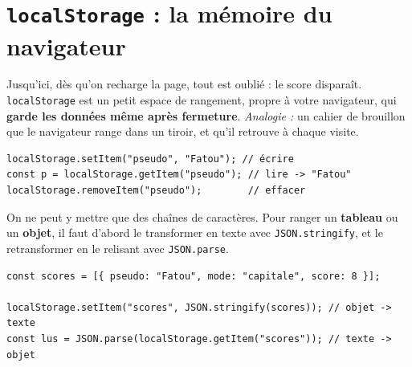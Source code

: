 \documentclass[11pt,a4paper]{article}
\newcommand{\code}[1]{\texttt{#1}}
\begin{document}
\section{\texttt{localStorage} : la mémoire du navigateur}

Jusqu'ici, dès qu'on recharge la page, tout est oublié : le score disparaît. \code{localStorage} est un petit espace de rangement, propre à votre navigateur, qui \textbf{garde les données même après fermeture}. \emph{Analogie :} un cahier de brouillon que le navigateur range dans un tiroir, et qu'il retrouve à chaque visite.

\begin{lstlisting}[style=js]
localStorage.setItem("pseudo", "Fatou"); // écrire
const p = localStorage.getItem("pseudo"); // lire -> "Fatou"
localStorage.removeItem("pseudo");        // effacer
\end{lstlisting}

\begin{center}
\end{center}

\begin{attentionbox}
On ne peut y mettre que des chaînes de caractères. Pour ranger un \textbf{tableau} ou un \textbf{objet}, il faut d'abord le transformer en texte avec \code{JSON.stringify}, et le retransformer en le relisant avec \code{JSON.parse}.
\end{attentionbox}

\begin{lstlisting}[style=js]
const scores = [{ pseudo: "Fatou", mode: "capitale", score: 8 }];

localStorage.setItem("scores", JSON.stringify(scores)); // objet -> texte
const lus = JSON.parse(localStorage.getItem("scores")); // texte -> objet
\end{lstlisting}
\end{document}

